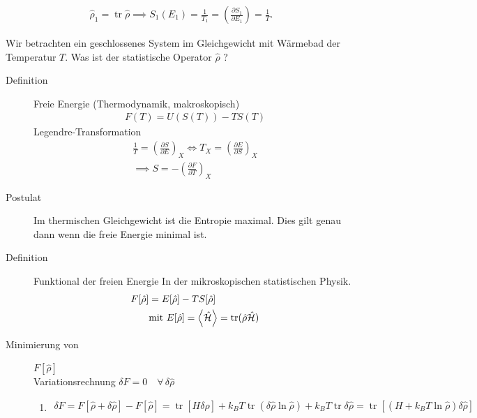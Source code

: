 \documentclass[11pt]{article}
\theoremstyle{plain}
\newcommand{\pd}[2]{\frac{\partial #1 }{\partial #2}}
\newcommand{\trace}{\operatorname{tr}}
\begin{document}
%

%
\begin{align*}
  \hat{\rho}_1 = \trace \hat{\rho} \implies S_1 (E_1) = 
  \frac{1}{T_1} = \left( \pd{S_1}{E_1} \right) = \frac{1}{T} .
\end{align*}
%

Wir betrachten ein geschlossenes System im Gleichgewicht mit W\"armebad der 
Temperatur $T$. Was ist der statistische Operator $\hat{\rho}$ ?

\begin{description}
  \item[Definition]  Freie Energie (Thermodynamik, makroskopisch)
    \begin{align*}
      F(T) = U(S(T)) - T S(T)
    \end{align*}
    Legendre-Transformation
    \begin{align*}
      \frac{1}{T} = \left( \pd{S}{E} \right)_X \iff T_X =
      \left( \pd{E}{S} \right)_X \\
      \implies S = - \left( \pd{F}{T} \right)_X
    \end{align*}
  \item[Postulat] Im thermischen Gleichgewicht ist die Entropie maximal. 
    Dies gilt genau dann wenn die freie Energie minimal ist.
  \item[Definition] Funktional der freien Energie In der 
    mikroskopischen statistischen Physik.
    \begin{align*}
      F[\hat{\rho}] & = E[\hat{\rho}] - T S [\hat{\rho}] \\
                    & \text{mit } E [\hat{\rho}] = \Braket{\hat{ \mathcal{H}}}
      = \trace (\hat{\rho} \hat{ \mathcal{H}})
    \end{align*}
  \item[Minimierung von ] $F[\hat{\rho}]$ \\
    Variationsrechnung $\delta F= 0 \quad\forall\, \delta \hat{\rho}$
    \begin{enumerate}
      \item %
      \begin{align*}
        \delta F = F \left[ \hat{\rho} + \delta \hat{ \rho} \right] -
        F \left[ \hat{\rho} \right] = \trace [H \delta \hat{\rho}] 
        + k_B T \trace (\delta \hat{\rho} \ln{\hat{\rho}}) + k_B T \trace
        \delta \hat{\rho} = 
        \trace [ ( H+ k_B T \ln{ \hat{\rho}}) \delta \hat{\rho}] \\
      \end{align*}

\end{enumerate}
\end{description}
\end{document}
